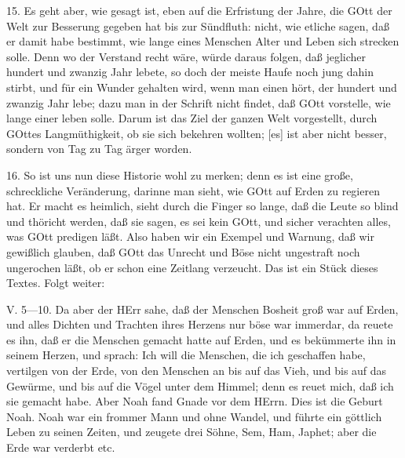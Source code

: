 15. Es geht aber, wie gesagt ist, eben auf die Erfristung der Jahre, die GOtt der Welt zur Besserung gegeben hat bis zur Sündfluth: nicht, wie etliche sagen, daß er damit habe bestimmt, wie lange eines Menschen Alter und Leben sich strecken solle. Denn wo der Verstand recht wäre, würde daraus folgen, daß jeglicher hundert und
zwanzig Jahr lebete, so doch der meiste Haufe noch jung dahin stirbt, und für ein Wunder gehalten wird, wenn man einen hört, der hundert und zwanzig Jahr lebe; dazu man in der Schrift nicht findet, daß GOtt vorstelle, wie lange einer leben solle. Darum ist das Ziel der ganzen Welt vorgestellt, durch GOttes Langmüthigkeit, ob sie sich bekehren wollten; [es] ist aber nicht besser, sondern von Tag zu Tag ärger worden.

16. So ist uns nun diese Historie wohl zu merken; denn es ist eine große, schreckliche Veränderung, darinne man sieht, wie GOtt auf Erden zu regieren hat. Er macht es heimlich, sieht durch die Finger so lange, daß die Leute so blind und thöricht werden, daß sie sagen, es sei kein GOtt, und sicher verachten alles, was GOtt predigen läßt. Also haben wir ein Exempel und Warnung, daß wir gewißlich glauben, daß GOtt das Unrecht und Böse nicht ungestraft noch ungerochen läßt, ob er schon eine Zeitlang verzeucht. Das ist ein Stück dieses Textes. Folgt weiter:

\begin{schriftzitat}
V. 5—10. Da aber der HErr sahe, daß der Menschen Bosheit groß war auf Erden, und alles Dichten und Trachten ihres Herzens nur böse war immerdar, da reuete es ihn, daß er die Menschen gemacht hatte auf Erden, und es bekümmerte ihn in seinem Herzen, und sprach: Ich will die Menschen, die ich geschaffen habe, vertilgen von der Erde, von den Menschen an bis auf das Vieh, und bis auf das Gewürme, und bis auf die Vögel unter dem Himmel; denn es reuet mich, daß ich sie gemacht habe. Aber Noah fand Gnade vor dem HErrn. Dies ist die Geburt Noah. Noah war ein frommer Mann und ohne Wandel, und führte ein göttlich Leben zu seinen Zeiten, und zeugete drei Söhne, Sem, Ham, Japhet; aber die Erde war verderbt etc.
\end{schriftzitat}

